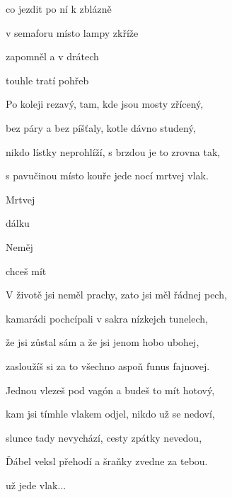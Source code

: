 

\zs
{} co jezdit po ní  k zblázně

v semaforu místo lampy  zkříže

 zapomněl a  v drátech 

 touhle tratí  pohřeb
\ks

\zs
Po koleji rezavý, tam, kde jsou mosty zřícený,

bez páry a bez píšťaly, kotle dávno studený,

nikdo lístky neprohlíží, s brzdou je to zrovna tak,

s pavučinou místo kouře jede nocí mrtvej vlak.
\ks

\zr
Mrtvej   

dálku   

Neměj  

chceš mít    
\kr

\zs
V životě jsi neměl prachy, zato jsi měl řádnej pech,

kamarádi pochcípali v sakra nízkejch tunelech,

že jsi zůstal sám a že jsi jenom hobo ubohej,

zasloužíš si za to všechno aspoň funus fajnovej.
\ks

\zs
Jednou vlezeš pod vagón a budeš to mít hotový,

kam jsi tímhle vlakem odjel, nikdo už se nedoví,

slunce tady nevychází, cesty zpátky nevedou,

Ďábel veksl přehodí a šraňky zvedne za tebou.
\ks

\zr\kr

už jede  vlak...


\kp
